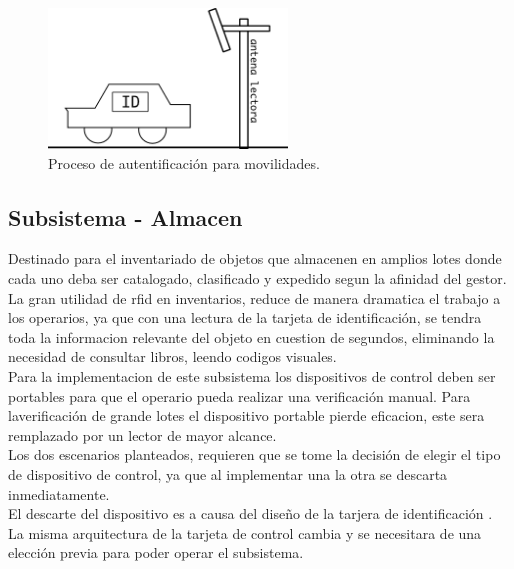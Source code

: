 \documentclass[11pt,twocolumn]{article}
\begin{document}
\begin{figure}[!h]
  \begin{center}
    \includegraphics[width=2.5in]{garage.png}
  \end{center}

  \caption{\small Proceso de autentificaci\'on para movilidades.}
  \label{fig-centinela}
\end{figure} 

\subsection{Subsistema - Almacen}

Destinado para el inventariado de objetos que  almacenen en amplios lotes 
donde cada uno deba ser catalogado, clasificado y expedido segun la afinidad
 del gestor.\\
 
La gran utilidad de rfid en inventarios, reduce de manera dramatica el trabajo 
a los operarios, ya que con una lectura de la tarjeta de identificaci\'on, se 
tendra toda la informacion relevante del objeto en cuestion de segundos, eliminando 
la necesidad de consultar libros, leendo codigos visuales.\\


Para la implementacion de este subsistema los dispositivos de control deben ser 
portables para que el operario pueda realizar una verificaci\'on manual. Para 
laverificaci\'on de grande lotes  el dispositivo portable pierde eficacion, este 
sera remplazado por un lector de mayor alcance.\\

Los dos escenarios planteados, requieren que se tome la decisi\'on de elegir el 
tipo de dispositivo de control, ya que al implementar una la otra se descarta 
inmediatamente.\\

El descarte del dispositivo es a causa del dise\~no de la tarjera de identificaci\'on 
. La misma arquitectura de la tarjeta de control cambia y se necesitara de una elecci\'on 
previa para poder operar el subsistema.\\
\end{document}
